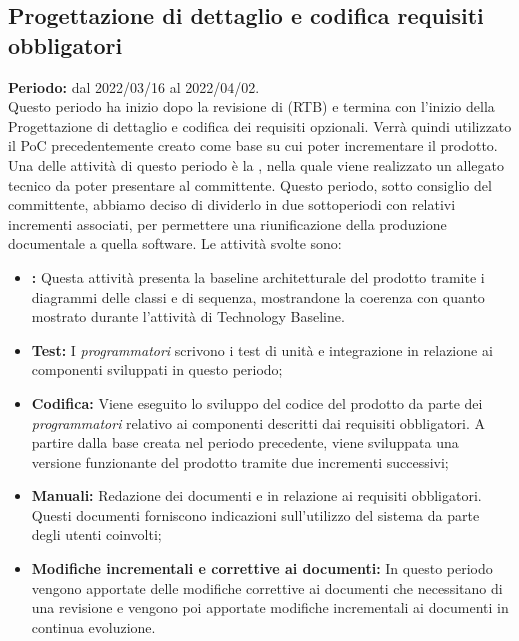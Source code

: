 
\subsection{Progettazione di dettaglio e codifica requisiti obbligatori} \label{subsection:pianificazione_requisiti_obbligatori}
\textbf{Periodo:} dal 2022/03/16 al 2022/04/02.
\bigskip
\\Questo periodo ha inizio dopo la revisione di \RTB{} (RTB\glo{}) e termina con l'inizio della Progettazione di dettaglio e codifica dei requisiti opzionali.
Verrà quindi utilizzato il PoC\glo{} precedentemente creato come base su cui poter incrementare il prodotto.
Una delle attività di questo periodo è la \PB{}, nella quale viene realizzato un allegato tecnico da poter presentare al committente.
Questo periodo, sotto consiglio del committente, abbiamo deciso di dividerlo in due sottoperiodi con relativi incrementi associati, per permettere una riunificazione della produzione documentale a quella software.
Le attività svolte sono:
\begin{itemize}
  \item \textbf{\PB{}:} Questa attività presenta la baseline architetturale del prodotto tramite i diagrammi delle classi e di sequenza, mostrandone la coerenza con quanto mostrato durante l'attività di Technology Baseline.
  \item \textbf{Test:} I \textit{programmatori} scrivono i test di unità e integrazione in relazione ai componenti sviluppati in questo periodo;
  \item \textbf{Codifica:} Viene eseguito lo sviluppo del codice del prodotto da parte dei \textit{programmatori} relativo ai componenti descritti dai requisiti obbligatori.
        A partire dalla base creata nel periodo precedente, viene sviluppata una versione funzionante del prodotto tramite due incrementi successivi;
  \item \textbf{Manuali:} Redazione dei documenti \docNameVersionMU{} e \docNameVersionMS{} in relazione ai requisiti obbligatori.
        Questi documenti forniscono indicazioni sull'utilizzo del sistema da parte degli utenti coinvolti;
  \item \textbf{Modifiche incrementali e correttive ai documenti:} In questo periodo vengono apportate delle modifiche correttive ai documenti che necessitano di una revisione e vengono poi apportate modifiche incrementali ai documenti in continua evoluzione.
\end{itemize}

